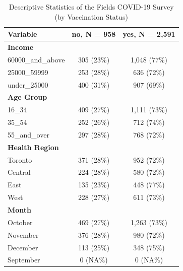 \documentclass[
  letterpaper,
  DIV=11,
  numbers=noendperiod]{scrartcl}
\begin{document}
\hypertarget{tbl-descriptive-stats}{}
\begin{table}
\caption{\label{tbl-descriptive-stats}Descriptive Statistics of the Fields COVID-19 Survey (by Vaccination
Status) }\tabularnewline

\centering\begingroup\fontsize{9}{11}\selectfont

\begin{tabular}{lcc}
\toprule
\textbf{Variable} & \textbf{no}, N = 958 & \textbf{yes}, N = 2,591\\
\midrule
\textbf{Income} &  & \\
\hspace{1em}60000\_and\_above & 305 (23\%) & 1,048 (77\%)\\
\hspace{1em}25000\_59999 & 253 (28\%) & 636 (72\%)\\
\hspace{1em}under\_25000 & 400 (31\%) & 907 (69\%)\\
\textbf{Age Group} &  & \\
\hspace{1em}16\_34 & 409 (27\%) & 1,111 (73\%)\\
\hspace{1em}35\_54 & 252 (26\%) & 712 (74\%)\\
\hspace{1em}55\_and\_over & 297 (28\%) & 768 (72\%)\\
\textbf{Health Region} &  & \\
\hspace{1em}Toronto & 371 (28\%) & 952 (72\%)\\
\hspace{1em}Central & 224 (28\%) & 580 (72\%)\\
\hspace{1em}East & 135 (23\%) & 448 (77\%)\\
\hspace{1em}West & 228 (27\%) & 611 (73\%)\\
\textbf{Month} &  & \\
\hspace{1em}October & 469 (27\%) & 1,263 (73\%)\\
\hspace{1em}November & 376 (28\%) & 980 (72\%)\\
\hspace{1em}December & 113 (25\%) & 348 (75\%)\\
\hspace{1em}September & 0 (NA\%) & 0 (NA\%)\\

\end{tabular}
\end{table}
\end{document}
